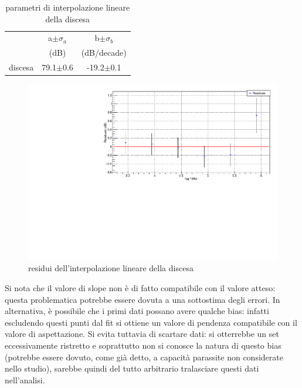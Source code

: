 \documentclass{article}
\begin{document}
\begin{table}[ht]
    \centering
    \begin{tabular}{rcccc}
        \toprule
                &\multicolumn{2}{c}{a$\pm \sigma_a$} &\multicolumn{2}{c}{b$\pm \sigma_b$}\\
                &\multicolumn{2}{c}{(dB)}  &\multicolumn{2}{c}{(dB/decade)}\\
        \midrule
        discesa &\multicolumn{2}{c}{79.1$\pm$0.6}&\multicolumn{2}{c}{-19.2$\pm$0.1}\\
        \bottomrule
    \end{tabular}
    \caption{parametri di interpolazione lineare della discesa}
\end{table}


\begin{center}
    \begin{figure}[H]
    \centering
    \includegraphics[scale=0.4, angle=0]{residuipreamplineare.pdf}
    \caption{residui dell'interpolazione lineare della discesa}
    \label{fig:bodepreamp_res}
    \end{figure}
\end{center}

Si nota che il valore di slope non è di fatto
compatibile con il valore atteso: questa
problematica potrebbe essere dovuta a una sottostima degli
errori. In alternativa, è possibile che i primi dati possano
avere qualche bias: infatti escludendo questi punti dal fit si
ottiene un valore di pendenza compatibile con il valore di
aspettazione. Si evita tuttavia di scartare dati: si otterrebbe
un set eccessivamente ristretto e soprattutto non si conosce
la natura di questo bias (potrebbe essere dovuto, come già detto, a
capacità parassite non considerate nello studio),
 sarebbe quindi del tutto arbitrario
tralasciare questi dati nell’analisi.
\end{document}
